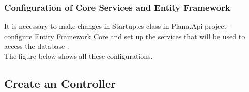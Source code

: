 \documentclass{scrartcl}
\begin{document}
\subsubsection{Configuration of Core Services and Entity Framework}

It is necessary to make changes in Startup.cs class in Plana.Api project - configure Entity Framework Core and set up the services that will be used to access the database \cite{efa}.\\
The figure below shows all these configurations.

\noindent%
\begin{minipage}{\linewidth}%
\end{minipage}


\subsection{Create an Controller}
\end{document}
